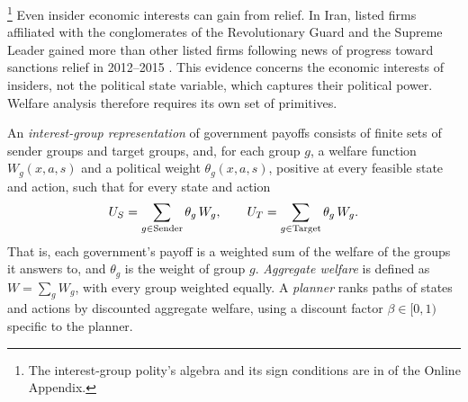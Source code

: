\footnote{The
interest-group polity's algebra and its sign conditions are in
 of the Online Appendix.} Even insider
economic interests can gain from relief. In Iran, listed firms affiliated with the
conglomerates of the Revolutionary Guard and the Supreme Leader gained more than other
listed firms following news of progress toward sanctions relief in 2012--2015
\citep{DracaGarredSticklandWarrinnier2023}. This evidence concerns the economic
interests of insiders, not the political state variable, which captures their political
power. Welfare analysis therefore requires its own set of primitives.

\begin{definition}
\label{def:interest-group-representation}
An \emph{interest-group representation} of government payoffs consists of finite sets
of sender groups and target groups, and, for each group $g$, a welfare function
$W_g(x,a,s)$ and a political weight $\theta_g(x,a,s)$, positive at every feasible state
and action, such that for every state and action
\[
U_S=\sum_{g\in\text{Sender}}\theta_g\,W_g,\qquad U_T=\sum_{g\in\text{Target}}\theta_g\,W_g .
\]
That is, each government's payoff is a weighted sum of the welfare of the groups it
answers to, and $\theta_g$ is the weight of group $g$.
\emph{Aggregate welfare} is defined as $W=\sum_g W_g$, with every group weighted
equally. A \emph{planner} ranks paths of states and actions by discounted aggregate
welfare, using a discount factor $\beta\in[0,1)$ specific to the planner.
\end{definition}

